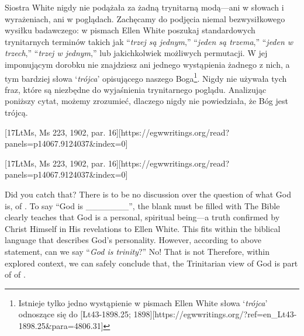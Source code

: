 Siostra White nigdy nie podążała za żadną trynitarną modą—ani w słowach i wyrażeniach, ani w poglądach. Zachęcamy do podjęcia niemal bezwysiłkowego wysiłku badawczego: w pismach Ellen White poszukaj standardowych trynitarnych terminów takich jak “\textit{trzej są jednym},” “\textit{jeden są trzema},” “\textit{jeden w trzech},” “\textit{trzej w jednym},” lub jakichkolwiek możliwych permutacji. W jej imponującym dorobku nie znajdziesz ani jednego wystąpienia żadnego z nich, a tym bardziej słowa ‘\textit{trójca}’ opisującego naszego Boga\footnote{Istnieje tylko jedno wystąpienie w pismach Ellen White słowa ‘\textit{trójca}’ odnoszące się do [Lt43-1898.25; 1898][https://egwwritings.org/?ref=en\_Lt43-1898.25&para=4806.31]}. Nigdy nie używała tych fraz, które są niezbędne do wyjaśnienia trynitarnego poglądu. Analizując poniższy cytat, możemy zrozumieć, dlaczego nigdy nie powiedziała, że Bóg jest trójcą.


[17LtMs, Ms 223, 1902, par. 16][https://egwwritings.org/read?panels=p14067.9124037&index=0]


[17LtMs, Ms 223, 1902, par. 16][https://egwwritings.org/read?panels=p14067.9124037&index=0]


Did you catch that? There is to be no discussion over the question of what God is,  of . To say “God is \_\_\_\_\_\_\_”, the blank must be filled with  The Bible clearly teaches that God is a personal, spiritual being—a truth confirmed by Christ Himself in His revelations to Ellen White. This fits within the biblical language that describes God’s personality. However, according to above statement, can we say “\textit{God is trinity}?” No! That is not  Therefore, within explored context, we can safely conclude that, the Trinitarian view of God is part of  of .


